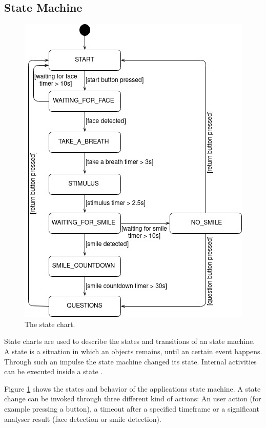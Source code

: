 \subsection{State Machine}

\begin{figure}
  \includegraphics[width=\linewidth]{figures/state_chart.jpg}
  \caption{The state chart.}
  \label{fig:state_chart}
\end{figure}

State charts are used to describe the states and transitions of an state machine. A state is a situation in which an objects remains, until an certain event happens. Through such an impulse the state machine changed its state. Internal activities can be executed inside a state \cite{Modeling_with_UML}.

Figure \ref{fig:state_chart} shows the states and behavior of the applications state machine.
A state change can be invoked through three different kind of actions: An user action (for example pressing a button), a timeout after a specified timeframe or a significant analyser result (face detection or smile detection).

